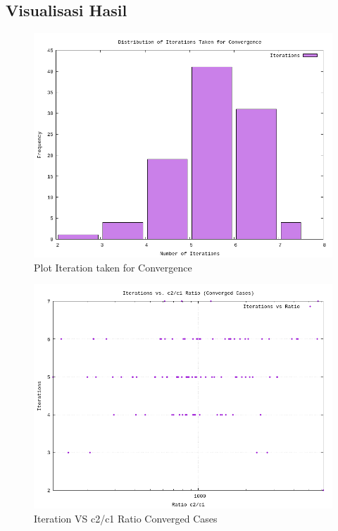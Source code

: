 \documentclass[conference]{IEEEtran}
\begin{document}
\subsection{Visualisasi Hasil}

\begin{figure}[H]
    \centering
    \includegraphics[width=0.75\linewidth]{../Gambar/plot_iterations_distribution.png}
    \caption{Plot Iteration taken for Convergence}
    \label{fig:iterations-distribution}
\end{figure}

\begin{figure}[H]
    \centering
    \includegraphics[width=0.75\linewidth]{../Gambar/plot_iterations_vs_c2_c1_ratio.png}
    \caption{Iteration VS c2/c1 Ratio Converged Cases}
    \label{fig:iterations-vs-ratio}
\end{figure}
\end{document}
